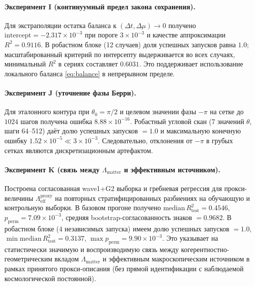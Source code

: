 \documentclass[11pt,a4paper]{article}
\theoremstyle{definition}
\theoremstyle{plain}
\theoremstyle{remark}
\begin{document}
\paragraph{Эксперимент I (континуумный предел закона сохранения).}
Для экстраполяции остатка баланса к $(\Delta t,\Delta\mu)\to 0$
получено
$\mathrm{intercept}=-2.317\times10^{-3}$
при пороге $3\times10^{-3}$ и качестве аппроксимации
$R^2=0.9116$.
В робастном блоке (12 случаев) доля успешных запусков равна $1.0$;
масштабированный критерий по интерсепту выдерживается во всех случаях,
минимальный $R^2$ в сериях составляет $0.6031$.
Это поддерживает использование локального баланса \eqref{eq:balance} в непрерывном пределе.

\paragraph{Эксперимент J (уточнение фазы Берри).}
Для эталонного контура при $\theta_0=\pi/2$ и целевом значении фазы $-\pi$
на сетке до $1024$ шагов получена ошибка
$8.88\times10^{-16}$.
Робастный угловой скан (7 значений $\theta$, шаги 64--512) даёт
долю успешных запусков $=1.0$ и
максимальную конечную ошибку
$1.52\times10^{-5}\ll 3\times10^{-3}$.
Следовательно, отклонения от $-\pi$ в грубых сетках являются дискретизационным артефактом.

\paragraph{Эксперимент K (связь между $\Lambda_{\mathrm{matter}}$ и эффективным источником).}
Построена согласованная wave1+G2 выборка и гребневая регрессия для прокси-величины
$\Lambda_{\mathrm{eff}}^{\mathrm{proxy}}$ на повторных стратифицированных разбиениях на обучающую и контрольную выборки.
В базовом прогоне получено
$\mathrm{median}\,R^2_{\mathrm{test}}=0.4546$,
$p_{\mathrm{perm}}=7.09\times10^{-3}$,
средняя bootstrap-согласованность знаков $=0.9682$.
В робастном блоке (4 независимых запуска) имеем
долю успешных запусков $=1.0$,
$\min\mathrm{median}\,R^2_{\mathrm{test}}=0.3137$,
$\max p_{\mathrm{perm}}=9.90\times10^{-3}$.
Это указывает на статистически значимую и воспроизводимую связь между
когерентностно-геометрическим вкладом $\Lambda_{\mathrm{matter}}$ и эффективным макроскопическим источником
в рамках принятого прокси-описания (без прямой идентификации с наблюдаемой космологической постоянной).
\end{document}
